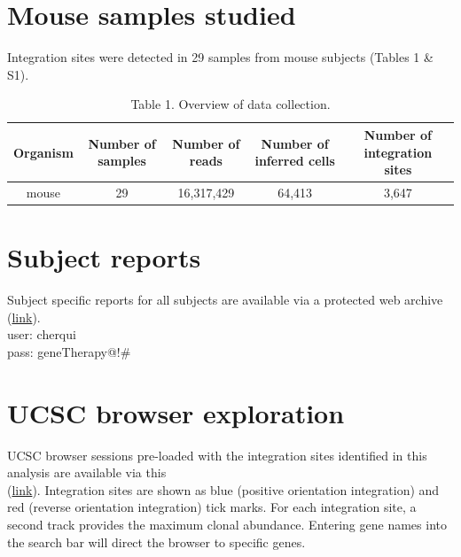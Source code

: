 \documentclass[12pt,]{article}
\begin{document}
\newpage

\section{Mouse samples studied}\label{mouse-samples-studied}

Integration sites were detected in 29 samples from mouse subjects
(Tables 1 \& S1).

\vspace{0.1cm}

\begin{table}[!h]

\caption{\label{tab:unnamed-chunk-2}Table 1. Overview of data collection.}
\centering
\begin{tabular}[t]{ccccc}
\toprule
Organism & Number of samples & Number of reads & Number of inferred cells & Number of integration sites\\
\midrule
mouse & 29 & 16,317,429 & 64,413 & 3,647\\
\bottomrule
\end{tabular}
\end{table}

\vspace{0.5cm}

\section{Subject reports}\label{subject-reports}

Subject specific reports for all subjects are available via a protected
web archive
(\href{http://www.bushmanlab.org/data/export/cherqui}{link}).\\
user: cherqui\\
pass: geneTherapy@!\#

\vspace{0.5cm}

\section{UCSC browser exploration}\label{ucsc-browser-exploration}

UCSC browser sessions pre-loaded with the integration sites identified
in this analysis are available via this\\
(\href{http://genome.ucsc.edu/cgi-bin/hgTracks?org=mouse\&db=mm9\&hgt.customText=http://microb120.med.upenn.edu/UCSC/cherqui/UCSC_CYS_mouse.group2.ucsc}{link}).
Integration sites are shown as blue (positive orientation integration)
and red (reverse orientation integration) tick marks. For each
integration site, a second track provides the maximum clonal abundance.
Entering gene names into the search bar will direct the browser to
specific genes.
\end{document}
